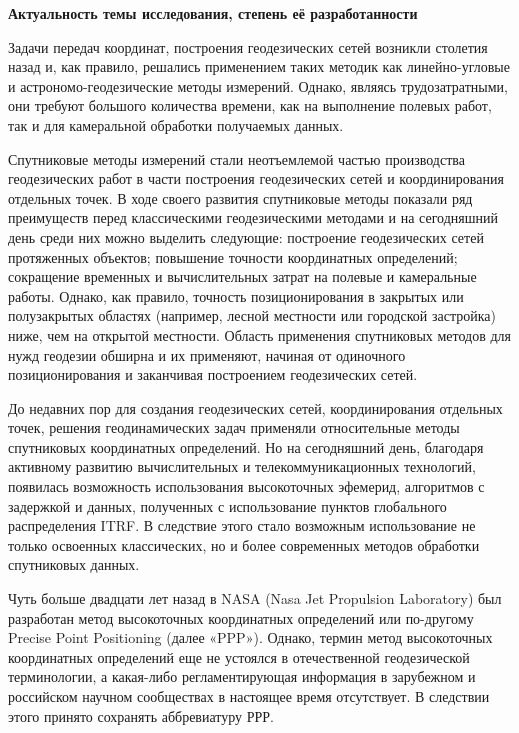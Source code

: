 
\begin{center}
	\textbf{Актуальность темы исследования, степень её разработанности}
\end{center}

{\actuality}
Задачи передач координат, построения геодезических сетей возникли столетия назад и, как правило, решались применением таких методик как линейно-угловые и астрономо-геодезические методы измерений. Однако, являясь трудозатратными, они требуют большого количества времени, как на выполнение полевых работ, так и для камеральной обработки получаемых данных.

Спутниковые методы измерений стали неотъемлемой частью производства геодезических работ в части построения геодезических сетей и координирования отдельных точек. В ходе своего развития спутниковые методы показали ряд преимуществ перед классическими геодезическими методами и на сегодняшний день среди них можно выделить следующие: построение геодезических сетей протяженных объектов; повышение точности координатных определений; сокращение временных и вычислительных затрат на полевые и камеральные работы. Однако, как правило, точность позиционирования в закрытых или полузакрытых областях (например, лесной местности или городской застройка) ниже, чем на открытой местности. Область применения спутниковых методов для нужд геодезии обширна и их применяют, начиная от одиночного позиционирования и заканчивая построением геодезических сетей.

До недавних пор для создания геодезических сетей, координирования отдельных точек, решения геодинамических задач применяли относительные методы спутниковых координатных определений. Но на сегодняшний день, благодаря активному развитию вычислительных и телекоммуникационных технологий, появилась возможность использования высокоточных эфемерид, алгоритмов с задержкой и данных, полученных с использование пунктов глобального распределения ITRF. В следствие этого стало возможным использование не только освоенных классических, но и более современных методов обработки спутниковых данных.

Чуть больше двадцати лет назад в NASA (Nasa Jet Propulsion Laboratory) был разработан метод высокоточных координатных определений или по-другому Precise Point Positioning (далее «PPP»). Однако, термин метод высокоточных координатных определений еще не устоялся в отечественной геодезической терминологии, а какая-либо регламентирующая информация в зарубежном и российском научном сообществах в настоящее время отсутствует. В следствии этого принято сохранять аббревиатуру РРР. 

